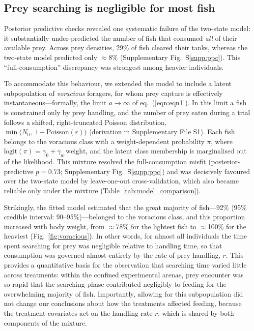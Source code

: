 
\subsection{Prey searching is negligible for most fish}

Posterior predictive checks revealed one systematic failure of the two-state
model: it substantially under-predicted the number of fish that consumed
\emph{all} of their available prey. Across prey densities, 29\% of fish cleared
their tanks, whereas the two-state model predicted only $\approx$8\%
(Supplementary Fig.~S\ref{supp:ppc}). This ``full-consumption'' discrepancy was
strongest among heavier individuals.

To accommodate this behaviour, we extended the model to include a latent
subpopulation of \emph{voracious} foragers, for whom prey capture is effectively
instantaneous---formally, the limit $a \to \infty$ of eq.~(\ref{eqn:eqn1}). In
this limit a fish is constrained only by prey handling, and the number of prey
eaten during a trial follows a shifted, right-truncated Poisson distribution,
$\min\!\big(N_0,\, 1 + \mathrm{Poisson}(r)\big)$ (derivation in
\hyperlink{supp:S1}{Supplementary File S1}). Each fish belongs to the voracious
class with a weight-dependent probability $\pi$, where
$\mathrm{logit}(\pi) = \gamma_0 + \gamma_w\,\mathrm{weight}$, and the latent class
membership is marginalised out of the likelihood. This mixture resolved the
full-consumption misfit (posterior-predictive $p = 0.73$;
Supplementary Fig.~S\ref{supp:ppc}) and was decisively favoured over the
two-state model by leave-one-out cross-validation, which also became reliable
only under the mixture (Table~\ref{tab:model_comparison}).

Strikingly, the fitted model estimated that the great majority of fish---92\%
(95\% credible interval: 90--95\%)---belonged to the voracious class, and this
proportion increased with body weight, from $\approx$78\% for the lightest fish
to $\approx$100\% for the heaviest (Fig.~\ref{fig:voracious}). In other words,
for almost all individuals the time spent searching for prey was negligible
relative to handling time, so that consumption was governed almost entirely by
the rate of prey handling, $r$. This provides a quantitative basis for the
observation that searching time varied little across treatments: within the
confined experimental arenas, prey encounter was so rapid that the searching
phase contributed negligibly to feeding for the overwhelming majority of fish.
Importantly, allowing for this subpopulation did not change our conclusions about
how the treatments affected feeding, because the treatment covariates act on the
handling rate $r$, which is shared by both components of the mixture.
